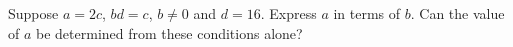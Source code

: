 Suppose $a=2c$, $bd=c$, $b\ne0$ and $d=16$. Express $a$ in terms of $b$. Can the value of $a$ be determined from these conditions alone?
